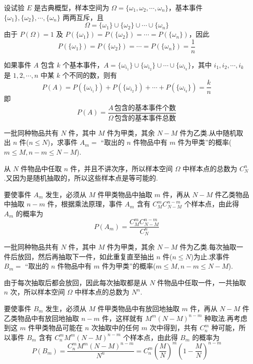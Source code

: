 设试验 $E$ 是古典概型，样本空间为 $\varOmega = \{\omega_1,\omega_2,\cdots,\omega_n\}$，基本事件 $\{\omega_1\},\{\omega_2\},\cdots,\{\omega_n\}$ 两两互斥，且
$$
\varOmega = \{\omega_1\} \cup \{\omega_2\} \cup \cdots \cup \{\omega_n\}
$$
由于 $P(\varOmega)=1$ 及 $P(\{\omega_1\})=P(\{\omega_2\})=\cdots=P(\{\omega_n\})$，因此
$$
P(\{\omega_1\})=P(\{\omega_2\})=\cdots=P(\{\omega_n\})=\dfrac{1}{n}
$$

如果事件 $A$ 包含 $k$ 个基本事件，$A=\{\omega_{i_1}\} \cup \{\omega_{i_2}\} \cup \cdots \cup \{\omega_{i_k}\}$，其中 $i_1,i_2,\cdots,i_k$ 是 $1,2,\cdots,n$ 中某 $k$ 个不同的数，则有
$$
P(A) = P(\{\omega_{i_1}\}) + P(\{\omega_{i_2}\}) + \cdots + P(\{\omega_{i_k}\}) = \dfrac{k}{n}
$$
即
$$
P(A)=\dfrac{A\,\text{包含的基本事件个数}}{\varOmega\,\text{包含的基本事件总数}}
$$

\begin{example}[][不放回抽样]
    \indent 一批同种物品共有 $N$ 件，其中 $M$ 件为甲类，其余 $N-M$ 件为乙类.从中随机取出 $n$ 件($n \leqslant N$)，求事件 $A_m=$ “取出的 $n$ 件物品中有 $m$ 件为甲类”的概率($m \leqslant M, n-m \leqslant N-M$).
\end{example}

\begin{solution}
    从 $N$ 件物品中任取 $n$ 件，并且不讲次序，所以样本空间 $\varOmega$ 中样本点的总数为 $C_N^n$.又因为是随机抽取的，所以这些样本点是等可能的.

    要使事件 $A_m$ 发生，必须从 $M$ 件甲类物品中抽取 $m$ 件，再从 $N-M$ 件乙类物品中抽取 $n-m$ 件，根据乘法原理，事件 $A_m$ 含有 $C_M^m C_{N-M}^{n-m}$ 个样本点，由此得 $A_m$ 的概率为
    $$
    P(A_m) = \dfrac{C_M^m C_{N-M}^{n-m}}{C_N^n}
    $$
\end{solution}

\begin{example}[][放回抽样]
    \indent 一批同种物品共有 $N$ 件，其中 $M$ 件为甲类，其余 $N-M$ 件为乙类.每次抽取一件后放回，然后再抽取下一件，如此重复直至抽出 $n$ 件($n \leqslant N$)为止.求事件 $B_m=$ “取出的 $n$ 件物品中有 $m$ 件为甲类”的概率($m \leqslant M, n-m \leqslant N-M$).
\end{example}

\begin{solution}
    由于每次抽取后都会放回，因此每次抽取都是从 $N$ 件物品中任取一件，一共抽取 $n$ 次，所以样本空间 $\varOmega$ 中样本点的总数为 $N^n$.

    要使事件 $B_m$ 发生，必须从 $M$ 件甲类物品中有放回地抽取 $m$ 件，再从 $N-M$ 件乙类物品中有放回地抽取 $n-m$ 件，这样就有 $M^m (N-M)^{n-m}$ 种取法.再考虑到这 $m$ 件甲类物品可能在 $n$ 次抽取中的任何 $m$ 次中得到，共有 $C_n^m$ 种可能，所以事件 $B_m$ 含有 $C_n^m M^m (N-M)^{n-m}$ 个样本点，由此得 $B_m$ 的概率为
    $$
    P(B_m) = \dfrac{C_n^m M^m (N-M)^{n-m}}{N^n} = C_n^m \left( \dfrac{M}{N} \right)^m \left( 1 - \dfrac{M}{N} \right)^{n-m}
    $$
\end{solution}

